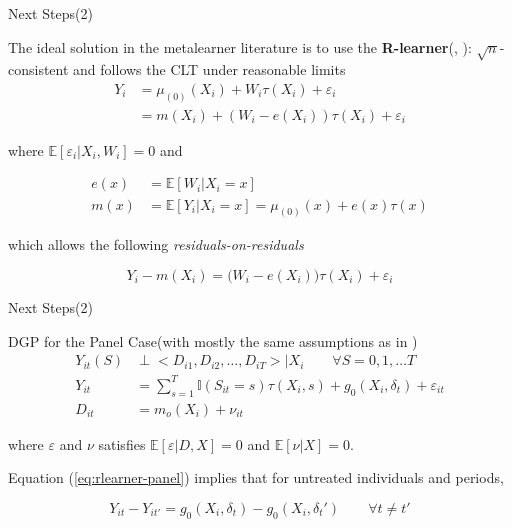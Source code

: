 \documentclass[12pt,  aspectratio=169]{beamer}    %
\begin{document}
\begin{frame}{Next  Steps(2)}

\footnotesize

The  ideal  solution  in  the  metalearner  literature  is  to  use  the\textbf{  R-learner}(\cite{kunzel2019metalearners},  \cite{chernozhukov2022locally}):  $\sqrt{n}$-consistent  and  follows  the  CLT  under  reasonable  limits
\begin{align}
Y_i  &=  \mu_(0)(X_i)  +  W_i  \tau(X_i)  +  \varepsilon_i\\
&=m(X_i)  +  (W_i-e(X_i))\tau(X_i)  +  \varepsilon_i
\end{align}

where  $\mathbb{E}[\varepsilon_i|X_i,  W_i]=0$  and  

\begin{align}
    e(x)  &=  \mathbb{E}[W_i|X_i=x]\\
    m(x)  &=  \mathbb{E}[Y_i|X_i=x]  =  \mu_{(0)}(x)  +  e(x)\tau(x)
\end{align}

which  allows  the  following  \textit{residuals-on-residuals}

$$
Y_i  -  m(X_i)  =  \bigl(W_i-e(X_i)\bigr)\tau(X_i)  +\varepsilon_i
$$

\end{frame}

\begin{frame}{Next  Steps(2)}

DGP  for  the  Panel  Case(with  mostly  the  same  assumptions  as  in  \textcite{sun_estimating_2021})
\begin{align}
Y_{it}(S)  &\perp  <D_{i1},  D_{i2},  \dots,  D_{iT}>  |  X_i  \qquad  \forall  S=0,  1,  \dots  T\\
Y_{it}  &=  \sum_{s=1}^T  \mathbb{I}(S_{it}  =  s)\tau(X_i,s)  +  g_0(X_i,  \delta_t)  +  \varepsilon_{it}  \label{eq:rlearner-panel}  \\
D_{it}  &=  m_o(X_i)  +  \nu_{it}
\end{align}

where  $\varepsilon$  and  $\nu$  satisfies  $\mathbb{E}[\varepsilon  |D,  X]  =  0$  and  $\mathbb{E}[\nu  |  X]  =  0$.

Equation  (\ref{eq:rlearner-panel})  implies  that  for  untreated  individuals  and  periods,

$$
Y_{it}  -  Y_{it'}  =  g_0(X_i,  \delta_t)  -  g_0(X_i,  \delta_t')  \qquad  \forall  t  \neq  t'
$$

\end{frame}
\end{document}
